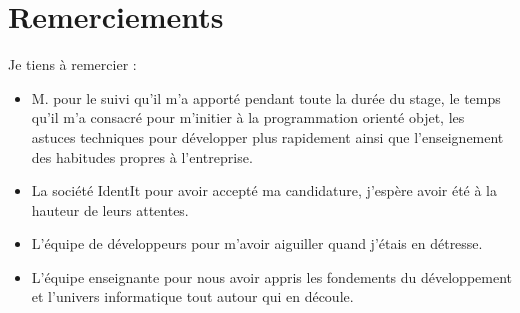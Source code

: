 \chapter*{Remerciements} %

Je tiens à remercier :
\begin{itemize}
\item M. pour le suivi qu'il m'a apporté pendant toute la durée du
stage, le temps qu'il m'a consacré pour m'initier à la programmation orienté
objet, les astuces techniques pour développer plus rapidement ainsi que
l'enseignement des habitudes propres à l'entreprise.
\item La société IdentIt pour avoir accepté ma candidature, j'espère avoir
été à la hauteur de leurs attentes.
\item L'équipe de développeurs pour m'avoir aiguiller quand j'étais en
détresse.
\item L'équipe enseignante pour nous avoir appris les fondements du
développement et l'univers informatique tout autour qui en découle.
\end{itemize}
